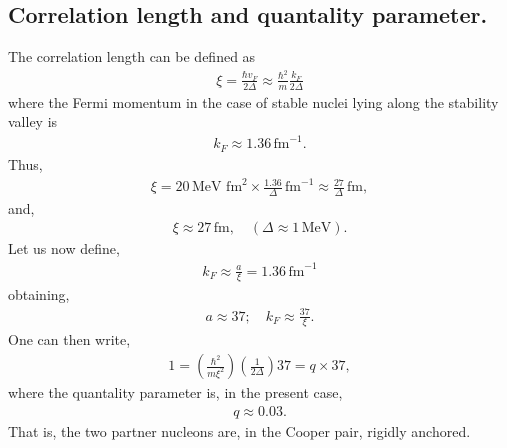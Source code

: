 \begin{subappendices}
\section{Correlation length and quantality parameter.}\label{App6H}
The correlation length can be defined as
\begin{align}\label{eqApp6H1}
\xi=\frac{\hbar v_F}{2\Delta}\approx\frac{\hbar^2}{m}\frac{k_F}{2\Delta}
\end{align}
where the Fermi momentum in the case of stable nuclei lying along the stability valley is
\begin{align}\label{eqApp6H2}
k_F\approx 1.36\,\text{fm}^{-1}.
\end{align}
Thus,
\begin{align}\label{eqApp6H3}
\xi=20\,\text{MeV fm}^2\times \frac{1.36}{\Delta}\,\text{fm}^{-1}\approx \frac{27}{\Delta}\,\text{fm},
\end{align}
and,
\begin{align}\label{eqApp6H4}
\xi\approx 27\,\text{fm},\quad (\Delta\approx1\,\text{MeV}).
\end{align}
Let us now define,
\begin{align}\label{eqApp6H5}
k_F\approx\frac{a}{\xi}=1.36\,\text{fm}^{-1}
\end{align}
obtaining, 
\begin{align}\label{eqApp6H6}
a\approx 37;\quad k_F\approx \frac{37}{\xi}.
\end{align}  
One can then write,
\begin{align}\label{eqApp6H7}
1=\left(\frac{\hbar^2}{m\xi^2}\right)\left(\frac{1}{2\Delta}\right)37=q\times 37,
\end{align} 
where the quantality parameter is, in the present case,
\begin{align}\label{eqApp6H8}
q\approx0.03.
\end{align} 
That is, the two partner nucleons are, in the Cooper pair, rigidly anchored.


\end{subappendices}
